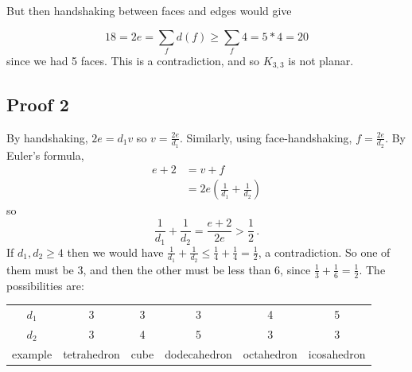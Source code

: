 \documentclass{amsart}
\begin{document}
But then handshaking between faces and edges would give

$$18=2e=\sum_f d(f)\geq \sum_f 4=5*4=20$$
since we had 5 faces.  This is a contradiction, and so $K_{3,3}$ is not planar.

\subsection{Proof 2} 

  By handshaking, $2e=d_1v$ so $v=\frac{2e}{d_1}$. Similarly, using face-handshaking, $f=\frac{2e}{d_2}$. By Euler's formula,
\begin{align*}
e+2&=v+f \\
&=2e\left(\frac{1}{d_1}+\frac{1}{d_2}\right)
\end{align*}
so
\[
\frac{1}{d_1}+\frac{1}{d_2}=\frac{e+2}{2e}>\frac{1}{2}\,.
\]
If $d_1, d_2\geq 4$ then we would have $\frac{1}{d_1}+\frac{1}{d_2}\leq\frac{1}{4}+\frac{1}{4}=\frac{1}{2}$, a contradiction. So one of them must be 3, and then the other must be less than 6, since $\frac{1}{3}+\frac{1}{6}=\frac{1}{2}$. The possibilities are:

\begin{tabular}{|c|ccccc|}
\hline
$d_1$ & 3 & 3 & 3 & 4 & 5 \\
$d_2$ & 3 & 4 & 5 & 3 & 3 \\
example & tetrahedron & cube & dodecahedron & octahedron & icosahedron \\
\hline
\end{tabular}
\end{document}
